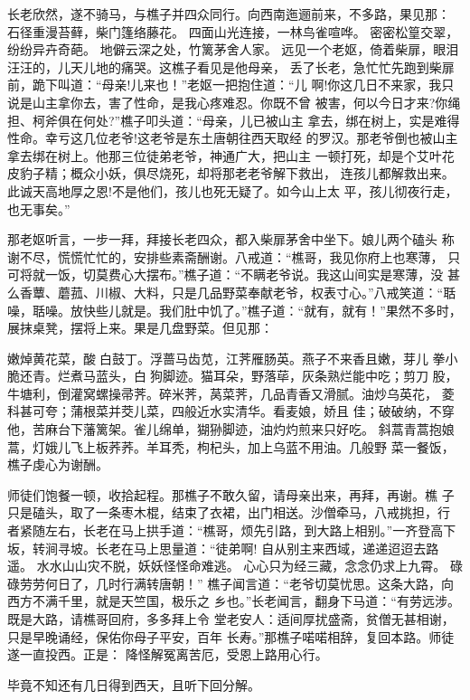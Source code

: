 长老欣然，遂不骑马，与樵子并四众同行。向西南迤逦前来，不多路，果见那：
石径重漫苔藓，柴门篷络藤花。
四面山光连接，一林鸟雀喧哗。
密密松篁交翠，纷纷异卉奇葩。
地僻云深之处，竹篱茅舍人家。
远见一个老妪，倚着柴扉，眼泪汪汪的，儿天儿地的痛哭。这樵子看见是他母亲，
丢了长老，急忙忙先跑到柴扉前，跪下叫道：“母亲!儿来也！”老妪一把抱住道：“儿
啊!你这几日不来家，我只说是山主拿你去，害了性命，是我心疼难忍。你既不曾
被害，何以今日才来?你绳担、柯斧俱在何处?”樵子叩头道：“母亲，儿已被山主
拿去，绑在树上，实是难得性命。幸亏这几位老爷!这老爷是东土唐朝往西天取经
的罗汉。那老爷倒也被山主拿去绑在树上。他那三位徒弟老爷，神通广大，把山主
一顿打死，却是个艾叶花皮豹子精；概众小妖，俱尽烧死，却将那老老爷解下救出，
连孩儿都解救出来。此诚天高地厚之恩!不是他们，孩儿也死无疑了。如今山上太
平，孩儿彻夜行走，也无事矣。”

那老妪听言，一步一拜，拜接长老四众，都入柴扉茅舍中坐下。娘儿两个磕头
称谢不尽，慌慌忙忙的，安排些素斋酬谢。八戒道：“樵哥，我见你府上也寒薄，
只可将就一饭，切莫费心大摆布。”樵子道：“不瞒老爷说。我这山间实是寒薄，没
甚么香蕈、蘑菰、川椒、大料，只是几品野菜奉献老爷，权表寸心。”八戒笑道：“聒
噪，聒噪。放快些儿就是。我们肚中饥了。”樵子道：“就有，就有！”果然不多时，
展抹桌凳，摆将上来。果是几盘野菜。但见那：

嫩焯黄花菜，酸白鼓丁。浮蔷马齿苋，江荠雁肠英。燕子不来香且嫩，芽儿
拳小脆还青。烂煮马蓝头，白狗脚迹。猫耳朵，野落荜，灰条熟烂能中吃；剪刀
股，牛塘利，倒灌窝螺操帚荠。碎米荠，莴菜荠，几品青香又滑腻。油炒乌英花，
菱科甚可夸；蒲根菜并茭儿菜，四般近水实清华。看麦娘，娇且
佳；破破纳，不穿他，苦麻台下藩篱架。雀儿绵单，猢狲脚迹，油灼灼煎来只好吃。
斜蒿青蒿抱娘蒿，灯娥儿飞上板荞荞。羊耳秃，枸杞头，加上乌蓝不用油。几般野
菜一餐饭，樵子虔心为谢酬。

师徒们饱餐一顿，收拾起程。那樵子不敢久留，请母亲出来，再拜，再谢。樵
子只是磕头，取了一条枣木棍，结束了衣裙，出门相送。沙僧牵马，八戒挑担，行
者紧随左右，长老在马上拱手道：“樵哥，烦先引路，到大路上相别。”一齐登高下
坂，转涧寻坡。长老在马上思量道：“徒弟啊!
自从别主来西域，递递迢迢去路遥。
水水山山灾不脱，妖妖怪怪命难逃。
心心只为经三藏，念念仍求上九霄。
碌碌劳劳何日了，几时行满转唐朝！”
樵子闻言道：“老爷切莫忧思。这条大路，向西方不满千里，就是天竺国，极乐之
乡也。”长老闻言，翻身下马道：“有劳远涉。既是大路，请樵哥回府，多多拜上令
堂老安人：适间厚扰盛斋，贫僧无甚相谢，只是早晚诵经，保佑你母子平安，百年
长寿。”那樵子喏喏相辞，复回本路。师徒遂一直投西。正是：
降怪解冤离苦厄，受恩上路用心行。

毕竟不知还有几日得到西天，且听下回分解。